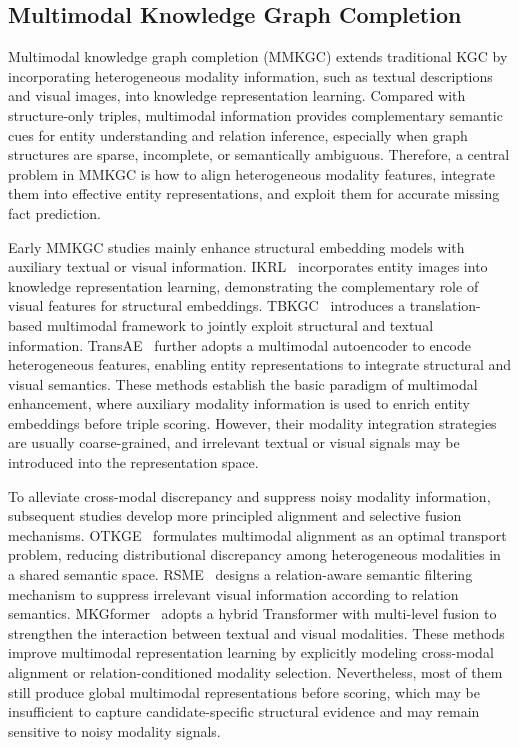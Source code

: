 \documentclass[a4paper,fleqn]{cas-sc}
\begin{document}
\subsection{Multimodal Knowledge Graph Completion}

Multimodal knowledge graph completion (MMKGC) extends traditional KGC by incorporating heterogeneous modality information, such as textual descriptions and visual images, into knowledge representation learning. Compared with structure-only triples, multimodal information provides complementary semantic cues for entity understanding and relation inference, especially when graph structures are sparse, incomplete, or semantically ambiguous. Therefore, a central problem in MMKGC is how to align heterogeneous modality features, integrate them into effective entity representations, and exploit them for accurate missing fact prediction.

Early MMKGC studies mainly enhance structural embedding models with auxiliary textual or visual information. IKRL~\cite{xie2017ikrl} incorporates entity images into knowledge representation learning, demonstrating the complementary role of visual features for structural embeddings. TBKGC~\cite{mousselly2018tbkgc} introduces a translation-based multimodal framework to jointly exploit structural and textual information. TransAE~\cite{wang2019transae} further adopts a multimodal autoencoder to encode heterogeneous features, enabling entity representations to integrate structural and visual semantics. These methods establish the basic paradigm of multimodal enhancement, where auxiliary modality information is used to enrich entity embeddings before triple scoring. However, their modality integration strategies are usually coarse-grained, and irrelevant textual or visual signals may be introduced into the representation space.

To alleviate cross-modal discrepancy and suppress noisy modality information, subsequent studies develop more principled alignment and selective fusion mechanisms. OTKGE~\cite{cao2022otkge} formulates multimodal alignment as an optimal transport problem, reducing distributional discrepancy among heterogeneous modalities in a shared semantic space. RSME~\cite{wang2021rsme} designs a relation-aware semantic filtering mechanism to suppress irrelevant visual information according to relation semantics. MKGformer~\cite{chen2022mkgformer} adopts a hybrid Transformer with multi-level fusion to strengthen the interaction between textual and visual modalities. These methods improve multimodal representation learning by explicitly modeling cross-modal alignment or relation-conditioned modality selection. Nevertheless, most of them still produce global multimodal representations before scoring, which may be insufficient to capture candidate-specific structural evidence and may remain sensitive to noisy modality signals.
\end{document}
